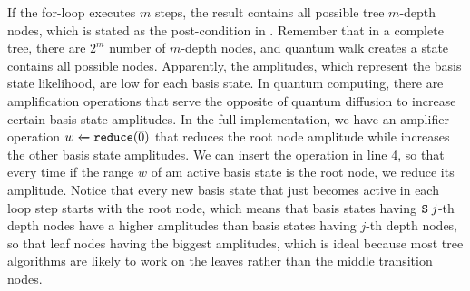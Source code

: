 If the for-loop executes $m$ steps, the result contains all possible tree $m$-depth nodes, which is stated as the post-condition in . Remember that in a complete tree, there are $2^m$ number of $m$-depth nodes, and quantum walk creates a state contains all possible nodes. Apparently, the amplitudes, which represent the basis state likelihood, are low for each basis state. In quantum computing, there are amplification operations that serve the opposite of quantum diffusion to increase certain basis state amplitudes. In the full \qafny implementation, we have an amplifier operation ${w} \xleftarrow{} {\texttt{reduce}(\overline{0})}$ that reduces the root node amplitude while increases the other basis state amplitudes. We can insert the operation in  line 4, so that every time if the range $w$ of am active basis state is the root node, we reduce its amplitude. Notice that every new basis state that just becomes active in each loop step starts with the root node, which means that basis states having $\texttt{S}\;j$-th depth nodes have a higher amplitudes than basis states having $j$-th depth nodes, so that leaf nodes having the biggest amplitudes, which is ideal because most tree algorithms are likely to work on the leaves rather than the middle transition nodes. 













